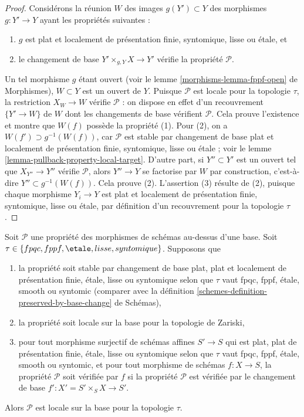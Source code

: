 \begin{proof}
Considérons la réunion $W$ des images $g(Y') \subset Y$ des morphismes
$g : Y' \to Y$ ayant les propriétés suivantes :
\begin{enumerate}
\item $g$ est plat et localement de présentation finie, syntomique, lisse
ou \'etale, et
\item le changement de base $Y' \times_{g, Y} X \to Y'$ vérifie la propriété
$\mathcal{P}$.
\end{enumerate}
Un tel morphisme $g$ étant ouvert (voir le lemme
\ref{morphisms-lemma-fppf-open} de Morphismes), $W \subset Y$ est un ouvert de $Y$.
Puisque $\mathcal{P}$ est locale pour la topologie $\tau$, la restriction
$X_W \to W$ vérifie $\mathcal{P}$ : on dispose en effet d'un recouvrement
$\{Y' \to W\}$ de $W$ dont les changements de base vérifient
$\mathcal{P}$. Cela prouve l'existence et montre que $W(f)$ possède la
propriété (1). Pour (2), on a $W(f') \supset g^{-1}(W(f))$, car
$\mathcal{P}$ est stable par changement de base plat et localement de
présentation finie, syntomique, lisse ou \'etale ; voir le
lemme \ref{lemma-pullback-property-local-target}. D'autre part, si
$Y'' \subset Y'$ est un ouvert tel que $X_{Y''} \to Y''$ vérifie
$\mathcal{P}$, alors $Y'' \to Y$ se factorise par $W$ par construction,
c'est-à-dire $Y'' \subset g^{-1}(W(f))$. Cela prouve (2). L'assertion (3)
résulte de (2), puisque chaque morphisme $Y_i \to Y$ est plat et localement
de présentation finie, syntomique, lisse ou \'etale, par définition d'un
recouvrement pour la topologie $\tau$.
\end{proof}

\begin{lemma}
\label{lemma-descending-properties-morphisms}
Soit $\mathcal{P}$ une propriété des morphismes de schémas au-dessus d'une
base. Soit $\tau \in \{fpqc, fppf, \etale, lisse, syntomique\}$. Supposons que
\begin{enumerate}
\item la propriété soit stable par changement de base plat, plat et
localement de présentation finie, \'etale, lisse ou syntomique selon que
$\tau$ vaut fpqc, fppf, \'etale, smooth ou syntomic (comparer avec la
définition \ref{schemes-definition-preserved-by-base-change} de Schémas),
\item la propriété soit locale sur la base pour la topologie de Zariski,
\item pour tout morphisme surjectif de schémas affines $S' \to S$ qui est
plat, plat de présentation finie, \'etale, lisse ou syntomique selon que
$\tau$ vaut fpqc, fppf, \'etale, smooth ou syntomic, et pour tout morphisme de
schémas $f : X \to S$, la propriété $\mathcal{P}$ soit vérifiée par $f$ si
la propriété $\mathcal{P}$ est vérifiée par le changement de base
$f' : X' = S' \times_S X \to S'$.
\end{enumerate}
Alors $\mathcal{P}$ est locale sur la base pour la topologie $\tau$.
\end{lemma}

